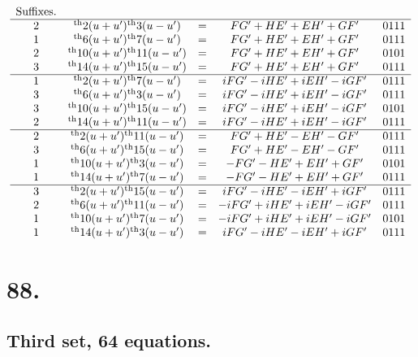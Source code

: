 \documentclass[11pt,a4paper]{book}
\providecommand{\uth}{\textsuperscript{th}}
\begin{document}
\[
\begin{array}{ccccc}
\text{Suffixes.} & & & & \\
\hline
2 & \uth{2}(u+u')\uth{3}(u-u') &=& FG' + HE' + EH' + GF' & 0111 \\
1 & \uth{6}(u+u')\uth{7}(u-u') &=& FG' + HE' + EH' + GF' & 0111 \\
2 & \uth{10}(u+u')\uth{11}(u-u') &=& FG' + HE' + EH' + GF' & 0101 \\
3 & \uth{14}(u+u')\uth{15}(u-u') &=& FG' + HE' + EH' + GF' & 0111 \\
\hline
1 & \uth{2}(u+u')\uth{7}(u-u') &=& iFG' - iHE' + iEH' - iGF' & 0111 \\
3 & \uth{6}(u+u')\uth{3}(u-u') &=& iFG' - iHE' + iEH' - iGF' & 0111 \\
3 & \uth{10}(u+u')\uth{15}(u-u') &=& iFG' - iHE' + iEH' - iGF' & 0101 \\
2 & \uth{14}(u+u')\uth{11}(u-u') &=& iFG' - iHE' + iEH' - iGF' & 0111 \\
\hline
2 & \uth{2}(u+u')\uth{11}(u-u') &=& FG' + HE' - EH' - GF' & 0111 \\
3 & \uth{6}(u+u')\uth{15}(u-u') &=& FG' + HE' - EH' - GF' & 0111 \\
1 & \uth{10}(u+u')\uth{3}(u-u') &=& -FG' - HE' + EH' + GF' & 0101 \\
1 & \uth{14}(u+u')\uth{7}(u-u') &=& -FG' - HE' + EH' + GF' & 0111 \\
\hline
3 & \uth{2}(u+u')\uth{15}(u-u') &=& iFG' - iHE' - iEH' + iGF' & 0111 \\
2 & \uth{6}(u+u')\uth{11}(u-u') &=& -iFG' + iHE' + iEH' - iGF' & 0111 \\
1 & \uth{10}(u+u')\uth{7}(u-u') &=& -iFG' + iHE' + iEH' - iGF' & 0101 \\
1 & \uth{14}(u+u')\uth{3}(u-u') &=& iFG' - iHE' - iEH' + iGF' & 0111
\end{array}
\]

\newpage
\section*{88.}
\label{sec:88}

\subsection*{Third set, 64 equations.}
\end{document}
